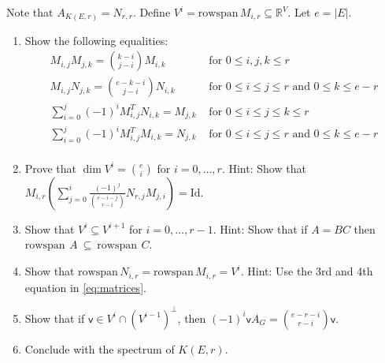 \documentclass[kulak]{tplt}
\theoremstyle{definition}
\newcommand{\R}{\mathbb{R}}
\newcommand{\vv}{\mathsf{v}}
\newcommand{\rowspn}{\mathrm{rowspan}}
\newcommand{\Id}{\mathrm{Id}}
\begin{document}
\begin{enumerate}
Note that $A_{K(E, r)} = N_{r, r}$.
Define $V^i = \rowspn \, M_{i, r} \subseteq \R^V$.
Let $e = |E|$.

\begin{enumerate}
\item
Show the following equalities:
\begin{equation}\label{eq:matrices}
\begin{split}
M_{i, j} M_{j, k} = \binom{k-i}{j-i} M_{i, k} &\text{ for $0\leq i , j, k \leq r$}\\
M_{i, j} N_{j, k} = \binom{e-k-i}{j-i} N_{i, k}  &\text{ for $0\leq i \leq j\leq r$ and $0\leq k \leq e-r$}\\
\sum_{i=0}^j (-1)^i M_{i, j}^T N_{i, k} = M_{j, k} &\text{ for $0\leq i \leq j \leq k \leq r$}\\
\sum_{i=0}^j (-1)^i M_{i, j}^T M_{i, k} = N_{j, k} &\text{ for $0\leq i\leq j \leq r$ and $0\leq k \leq e-r$}\\
\end{split}
\end{equation}

\item
Prove that $\dim V^i = \binom{e}{i}$ for $i=0, \ldots, r$. 
Hint: Show that $M_{i, r} \left( \sum_{j=0}^i \frac{(-1)^j}{\binom{e-i-j}{r-i}} N_{r, j} M_{j, i}\right) = \Id$.

\item Show that $V^i \subseteq V^{i+1}$ for $i=0, \ldots, r-1$.
Hint: Show that if $A = BC $ then $\rowspn\,~A~\subseteq~\rowspn\,~C$.

\item Show that $\rowspn \, N_{i, r} = \rowspn \, M_{i, r} = V^i$.
Hint: Use the 3rd and 4th equation in \eqref{eq:matrices}.

\item Show that if $\vv \in V^i \cap (V^{i-1})^{\perp}$, then $(-1)^i \vv A_G = \binom{e-r-i}{r-i} \vv $.


\item Conclude with the spectrum of $K(E, r)$.
\end{enumerate}
\end{enumerate}
\end{document}

